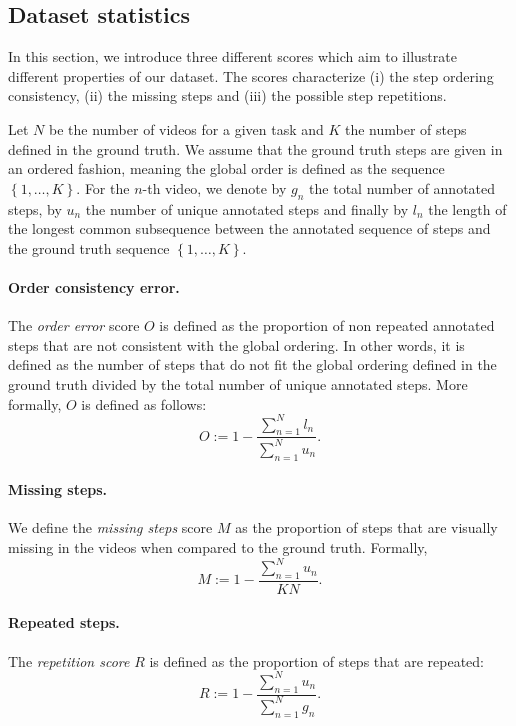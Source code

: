 \documentclass[10pt,twocolumn,letterpaper]{article}
\begin{document}
\subsection{Dataset statistics}
\label{subsec:score_dataset}

In this section, we introduce three different scores which aim to illustrate different properties of our dataset.
The scores characterize (i) the step ordering consistency, (ii) the missing steps and (iii) the possible step repetitions.
 
Let $N$ be the number of videos for a given task and $K$ the number of steps defined in the ground truth.
We assume that the ground truth steps are given in an ordered fashion, meaning the global order is defined as the sequence $\left\lbrace 1,\ldots, K \right\rbrace $. 
For the $n$-th video, we denote by $g_n$ the total number of annotated steps, by $u_n$ the number of unique annotated steps and finally by $l_n$ the length of the longest common subsequence between the annotated sequence of steps and the ground truth sequence $\left\lbrace 1,\ldots, K \right\rbrace$.

\paragraph{Order consistency error.}
The \emph{order error} score $O$ is defined as the proportion of non repeated annotated steps that are not consistent with the global ordering.
In other words, it is defined as the number of steps that do not fit the global ordering defined in the ground truth divided by the total number of unique annotated steps.
More formally, $O$ is defined as follows:
\begin{equation}
O := 1-\frac{\sum_{n=1}^N l_n}{\sum_{n=1}^N u_n}.
\label{order_score}
\end{equation}

\paragraph{Missing steps.} 
We define the \emph{missing steps} score $M$ as the proportion of steps that are visually missing in the videos when compared to the ground truth.
Formally, 
\begin{equation}
M := 1-\frac{\sum_{n=1}^N u_n}{KN}.
\label{missing_score}
\end{equation}

\paragraph{Repeated steps.}
The \emph{repetition score} $R$ is defined as the proportion of steps that are repeated:
\begin{equation}
R := 1-\frac{\sum_{n=1}^N u_n}{\sum_{n=1}^N g_n}.
\label{repet_score}
\end{equation}
\end{document}
